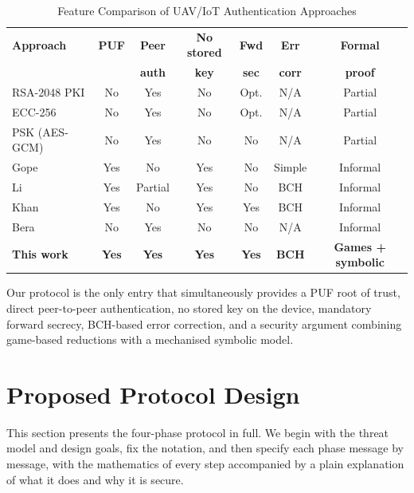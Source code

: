 \documentclass[11pt,a4paper]{article}
\begin{document}
\begin{table}[H]
\centering
\caption{Feature Comparison of UAV/IoT Authentication Approaches}
\label{tab:related_comparison}
\small
\begin{tabular}{@{}p{3.0cm}cccccc@{}}
\toprule
\textbf{Approach} & \textbf{PUF} & \textbf{Peer} & \textbf{No stored} & \textbf{Fwd} & \textbf{Err} & \textbf{Formal} \\
                  &              & \textbf{auth} & \textbf{key}       & \textbf{sec} & \textbf{corr} & \textbf{proof} \\
\midrule
RSA-2048 PKI & No & Yes & No & Opt. & N/A & Partial \\
ECC-256 & No & Yes & No & Opt. & N/A & Partial \\
PSK (AES-GCM) & No & Yes & No & No & N/A & Partial \\
Gope~\cite{puf_lightweight_uav} & Yes & No & Yes & No & Simple & Informal \\
Li~\cite{puf_uav_cross_domain} & Yes & Partial & Yes & No & BCH & Informal \\
Khan~\cite{puf_6g_uav} & Yes & No & Yes & Yes & BCH & Informal \\
Bera~\cite{peer2peer_auth} & No & Yes & No & No & N/A & Informal \\
\textbf{This work} & \textbf{Yes} & \textbf{Yes} & \textbf{Yes} & \textbf{Yes} & \textbf{BCH} & \textbf{Games + symbolic} \\
\bottomrule
\end{tabular}
\normalsize
\end{table}

Our protocol is the only entry that simultaneously provides a PUF root of
trust, direct peer-to-peer authentication, no stored key on the device,
mandatory forward secrecy, BCH-based error correction, and a security argument
combining game-based reductions with a mechanised symbolic model.

\section{Proposed Protocol Design}
\label{sec:protocol}

This section presents the four-phase protocol in full. We begin with the
threat model and design goals, fix the notation, and then specify each phase
message by message, with the mathematics of every step accompanied by a plain
explanation of what it does and why it is secure.
\end{document}
